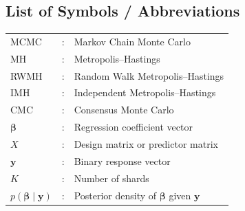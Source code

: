 \documentclass[12pt]{xmumthesis}
\begin{document}
\begin{romanpages}
\begin{abstract}
To address this, Consensus Monte Carlo offers a scalable alternative by partitioning data into shards, running separate MCMC chains locally, and combining the results to approximate the full posterior. This project implements a Consensus Monte Carlo framework using Independent Metropolis--Hastings (IMH) and Random Walk Metropolis--Hastings (RWMH). The study evaluates the accuracy of the consensus approach against full-data Metropolis--Hastings baselines.

The CMC posterior means closely tracked the corresponding full-data posterior means, with posterior mean RMSE values of approximately 0.0057 for CMC-RWMH and 0.0060 for CMC-IMH. The recorded wall-clock runtimes were shorter for the CMC methods under the current single-machine parallel implementation. This runtime result is specific to the present implementation and computing environment and should not be interpreted as a hardware-independent speedup claim.

\vspace{6ex}

: Bayesian Inference, Markov Chain Monte Carlo (MCMC), Metropolis--Hastings, Consensus Monte Carlo.

\end{abstract}



\tableofcontents                     %
\listoftables                            %
\listoffigures                           %


\chapter*{List of Symbols / Abbreviations}

\begin{tabular}{lll}
MCMC & : & Markov Chain Monte Carlo \\[1ex]
MH & : & Metropolis--Hastings \\[1ex]
RWMH & : & Random Walk Metropolis--Hastings \\[1ex]
IMH & : & Independent Metropolis--Hastings \\[1ex]
CMC & : & Consensus Monte Carlo \\[1ex]
$\boldsymbol{\beta}$ & : & Regression coefficient vector \\[1ex]
$X$ & : & Design matrix or predictor matrix \\[1ex]
$\mathbf{y}$ & : & Binary response vector \\[1ex]
$K$ & : & Number of shards \\[1ex]
$p(\boldsymbol{\beta}\mid\mathbf{y})$ & : & Posterior density of $\boldsymbol{\beta}$ given $\mathbf{y}$
 
\end{tabular}

\end{romanpages}                %
\end{document}

